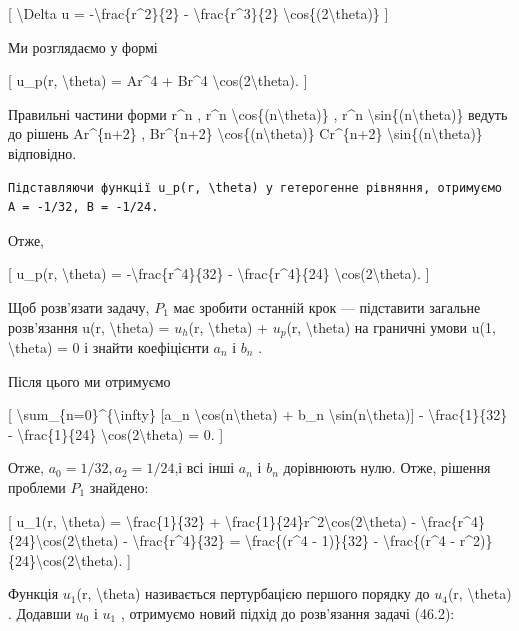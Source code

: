 \documentclass[
]{article}
\begin{document}
{{[} \textbackslash Delta u = -\textbackslash frac\{r\^{}2\}\{2\} -
\textbackslash frac\{r\^{}3\}\{2\}
\textbackslash cos\{(2\textbackslash theta)\} {]}

Ми розглядаємо у формі

{[} u\_p(r, \textbackslash theta) = Ar\^{}4 + Br\^{}4
\textbackslash cos(2\textbackslash theta). {]}

Правильні частини форми r\^{}n , r\^{}n
\textbackslash cos\{(n\textbackslash theta)\} , r\^{}n
\textbackslash sin\{(n\textbackslash theta)\} ведуть до рішень
Ar\^{}\{n+2\} , Br\^{}\{n+2\}
\textbackslash cos\{(n\textbackslash theta)\} Cr\^{}\{n+2\}
\textbackslash sin\{(n\textbackslash theta)\} відповідно.

\begin{verbatim}
Підставляючи функції u_p(r, \theta) у гетерогенне рівняння, отримуємо A = -1/32, B = -1/24.
\end{verbatim}

Отже,

{[} u\_p(r, \textbackslash theta) = -\textbackslash frac\{r\^{}4\}\{32\}
- \textbackslash frac\{r\^{}4\}\{24\}
\textbackslash cos(2\textbackslash theta). {]}

Щоб розв'язати задачу, \(P_1\) має зробити останній крок --- підставити
загальне розв'язання u(r, \textbackslash theta) = \(u_h\)(r,
\textbackslash theta) + \(u_p\)(r, \textbackslash theta) на граничні
умови u(1, \textbackslash theta) = 0 і знайти коефіцієнти \(a_n\) і
\(b_n\) .

Після цього ми отримуємо

{[} \textbackslash sum\_\{n=0\}\^{}\{\textbackslash infty\} {[}a\_n
\textbackslash cos(n\textbackslash theta) + b\_n
\textbackslash sin(n\textbackslash theta){]} -
\textbackslash frac\{1\}\{32\} - \textbackslash frac\{1\}\{24\}
\textbackslash cos(2\textbackslash theta) = 0. {]}

Отже, \(a_0=1/32 , a_2=1/24\),і всі інші \(a_n\) і \(b_n\) дорівнюють
нулю. Отже, рішення проблеми \(P_1\) знайдено:

{[} u\_1(r, \textbackslash theta) = \textbackslash frac\{1\}\{32\} +
\textbackslash frac\{1\}\{24\}r\^{}2\textbackslash cos(2\textbackslash theta)
-
\textbackslash frac\{r\^{}4\}\{24\}\textbackslash cos(2\textbackslash theta)
- \textbackslash frac\{r\^{}4\}\{32\} = \textbackslash frac\{(r\^{}4 -
1)\}\{32\} - \textbackslash frac\{(r\^{}4 -
r\^{}2)\}\{24\}\textbackslash cos(2\textbackslash theta). {]}

Функція \(u_1\)(r, \textbackslash theta) називається пертурбацією
першого порядку до \(u_4\)(r, \textbackslash theta) . Додавши \(u_0\) і
\(u_1\) , отримуємо новий підхід до розв'язання задачі (46.2):

}
\end{document}
